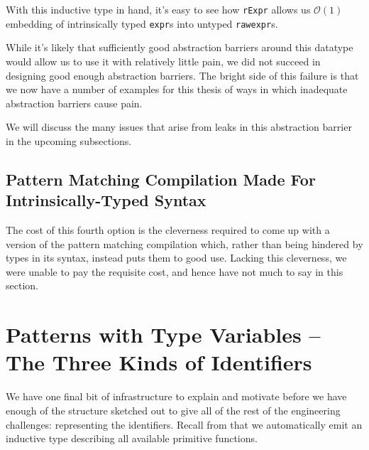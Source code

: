 With this inductive type in hand, it's easy to see how \texttt{rExpr} allows us $\mathcal{O}(1)$ embedding of intrinsically typed \texttt{expr}s into untyped \texttt{rawexpr}s.

While it's likely that sufficiently good abstraction barriers around this datatype would allow us to use it with relatively little pain, we did not succeed in designing good enough abstraction barriers.
The bright side of this failure is that we now have a number of examples for this thesis of ways in which inadequate abstraction barriers cause pain.

We will discuss the many issues that arise from leaks in this abstraction barrier in the upcoming subsections.


\subsection{Pattern Matching Compilation Made For Intrinsically-Typed Syntax}\label{sec:rewriting-more:AST:better-pattern-matching}
The cost of this fourth option is the cleverness required to come up with a version of the pattern matching compilation which, rather than being hindered by types in its syntax, instead puts them to good use.
Lacking this cleverness, we were unable to pay the requisite cost, and hence have not much to say in this section.

\section{Patterns with Type Variables -- The Three Kinds of Identifiers}\label{sec:rewriting-more:three-identifier-inductives}
We have one final bit of infrastructure to explain and motivate before we have enough of the structure sketched out to give all of the rest of the engineering challenges: representing the identifiers.
Recall from  that we automatically emit an inductive type describing all available primitive functions.

